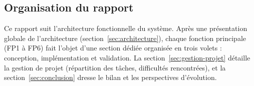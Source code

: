\subsection{Organisation du rapport}

Ce rapport suit l'architecture fonctionnelle du système. Après une présentation globale de l'architecture (section~\ref{sec:architecture}), chaque fonction principale (FP1 à FP6) fait l'objet d'une section dédiée organisée en trois volets : conception, implémentation et validation. La section~\ref{sec:gestion-projet} détaille la gestion de projet (répartition des tâches, difficultés rencontrées), et la section~\ref{sec:conclusion} dresse le bilan et les perspectives d'évolution.

\newpage
